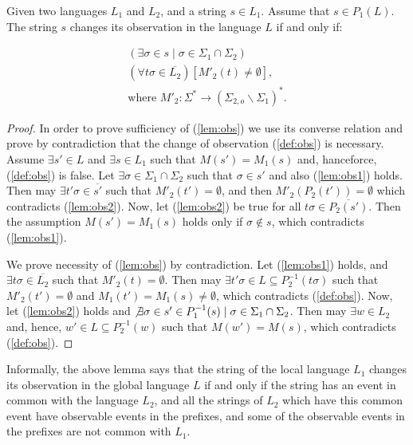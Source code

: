 \documentclass[a4paper, 10pt, conference]{ieeeconf}
\begin{document}
\begin{lemma}
\label{lem_changed_observation}
Given two languages $L_1$ and $L_2$, and a string $s \in L_1$.
Assume that $s \in P_1(L)$. The string $s$ changes its observation in the
language $L$ if and only if:
\end{lemma}
\begin{subequations}\label{lem:obs}
\begin{align}
	(\exists \sigma \in s \mid \sigma \in \Sigma_1 \cap \Sigma_2)
	\label{lem:obs1}
	\\
	(\forall t\sigma \in \overline{L_2})
	\left[M'_2(t) \neq \emptyset \right],
	\label{lem:obs2}
	\\
	\textrm{where } M'_2: \Sigma^* \rightarrow (\Sigma_{2,o} \backslash
	\Sigma_1)^*. 
	\label{lem:obs3}
\end{align}
\end{subequations}

\begin{proof}
In order to prove sufficiency of (\ref{lem:obs}) we use its converse relation
and prove by contradiction that the change of observation (\ref{def:obs}) is
necessary.
Assume $\exists s' \in L$ and $\exists s \in L_1$ such that
$M(s')= M_1(s)$ and, hanceforce, (\ref{def:obs}) is false. Let $\exists
\sigma \in \Sigma_1 \cap \Sigma_2$ such that $\sigma \in s'$ and also
(\ref{lem:obs1}) holds. Then may $\exists t'\sigma \in \overline{s'}$ such that
$M'_2(t') = \emptyset$, and then $M'_2(P_2(t')) =
\emptyset$ which contradicts (\ref{lem:obs2}). Now, let (\ref{lem:obs2})
be true for all $t\sigma \in \overline{P_2(s')}$. Then the assumption $M(s')=
M_1(s)$ holds only if $\sigma \not \in s$, which contradicts (\ref{lem:obs1}). 

We prove necessity of (\ref{lem:obs}) by contradiction.
Let (\ref{lem:obs1}) holds, and $\exists t\sigma \in \overline{L_2}$ such that
$M'_2(t) = \emptyset$. Then may $\exists t'\sigma \in 
L \subseteq P_2^{-1}(t\sigma)$ such that $M'_2(t') =
\emptyset$ and $M_1(t') = M_1(s) \neq \emptyset$, which contradicts
(\ref{def:obs}).
Now, let (\ref{lem:obs2}) holds and $\not \exists \sigma \in s' \in P_1^{-1}(s)
\mid \sigma \in \Sigma_1 \cap \Sigma_2$. Then may $\exists w \in L_2$ and,
hence, $w' \in L \subseteq P_2^{-1}(w)$ such that $M(w')=M(s)$,
which contradicts (\ref{def:obs}).
\end{proof}

Informally, the above lemma says that the string of the local language $L_1$
changes its observation in the global language $L$ if and only if the string has
an event in common with the language $L_2$, and all the strings of $L_2$ which
have this common event have observable events in the prefixes, and some of the
observable events in the prefixes are not common with $L_1$.
\end{document}

